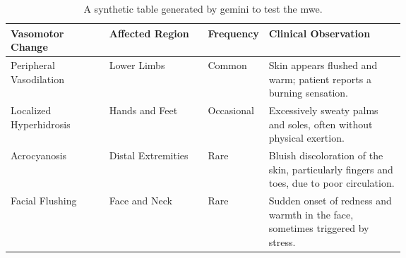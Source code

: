 \begin{table}[h!]
    \centering
    \begin{tabularx}{\linewidth}{p{0.25\linewidth}p{0.25\linewidth}p{0.15\linewidth}X}
        \toprule
        \textbf{Vasomotor Change} & \textbf{Affected Region} & \textbf{Frequency} & \textbf{Clinical Observation} \\
        \midrule
        Peripheral Vasodilation & Lower Limbs & Common & Skin appears flushed and warm; patient reports a burning sensation. \\
        Localized Hyperhidrosis & Hands and Feet & Occasional & Excessively sweaty palms and soles, often without physical exertion. \\
        Acrocyanosis & Distal Extremities & Rare & Bluish discoloration of the skin, particularly fingers and toes, due to poor circulation. \\
        Facial Flushing & Face and Neck & Rare & Sudden onset of redness and warmth in the face, sometimes triggered by stress. \\
        \bottomrule
    \end{tabularx}
    \caption[Vasomotor Changes in Tabes Dorsalis]{A synthetic table generated by gemini to test the mwe. \blindtext}
    \label{tab:vasomotor_changes2}
\end{table}